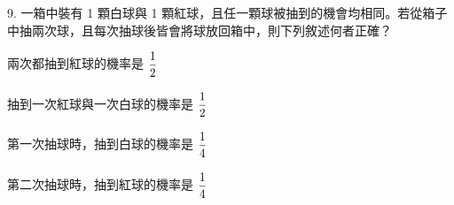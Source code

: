 \documentclass[12pt]{article}
\begin{document}
\begin{problem}
  \item[9.] 一箱中裝有 1 顆白球與 1 顆紅球，且任一顆球被抽到的機會均相同。若從箱子中抽兩次球，且每次抽球後皆會將球放回箱中，則下列敘述何者正確？
  \begin{choices}
    \item 兩次都抽到紅球的機率是 $\fraction{1}{2}$
    \item 抽到一次紅球與一次白球的機率是 $\fraction{1}{2}$
    \item 第一次抽球時，抽到白球的機率是 $\fraction{1}{4}$
    \item 第二次抽球時，抽到紅球的機率是 $\fraction{1}{4}$
  \end{choices}
\end{problem}
\end{document}
